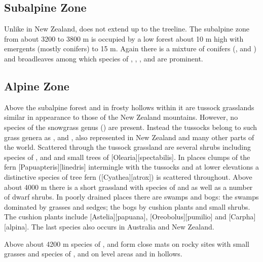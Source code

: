 \subsection{Subalpine Zone}

Unlike in New Zealand,  does not extend up to the treeline.
The subalpine zone from about 3200 to 3800 m is occupied by a low forest about 10 m high with emergents (mostly conifers) to 15 m.
Again there is a mixture of conifers (,  and ) and broadleaves among which species of , , ,  and  are prominent.

\subsection{Alpine Zone}

Above the subalpine forest and in frosty hollows within it are tussock grasslands similar in appearance to those of the New Zealand mountains.
However, no species of the snowgrass genus () are present.
Instead the tussocks belong to such grass genera as ,  and , also represented in New Zealand and many other parts of the world.
Scattered through the tussock grassland are several shrubs including species of ,  and  and small trees of [Olearia][spectabilis].
In places clumps of the fern [Papuapteris][linedris] intermingle with the tussocks and at lower elevations a distinctive species of tree fern ([Cyathea][atrox]) is scattered throughout.
Above about 4000 m there is a short grassland with species of  and  as well as a number of dwarf shrubs.
In poorly drained places there are swamps and bogs: the swamps dominated by grasses and sedges; the bogs by cushion plants and small shrubs.
The cushion plants include [Astelia][papuana], [Oreobolus][pumilio] and [Carpha][alpina].
The last species also occurs in Australia and New Zealand.

Above about 4200 m species of ,  and  form close mats on rocky sites with small grasses and species of ,  and  on level areas and in hollows.

